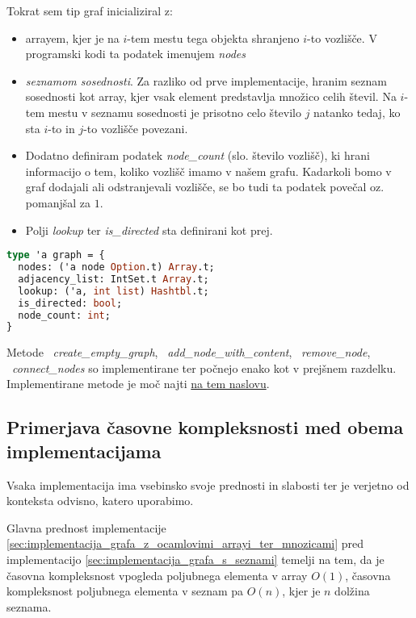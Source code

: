 \documentclass[mat1, tisk]{fmfdelo}
\begin{document}
Tokrat sem tip graf inicializiral z:
\begin{itemize}
  \item arrayem, kjer je na $i$-tem mestu tega objekta shranjeno $i$-to vozlišče. V programski kodi ta podatek imenujem \textit{nodes}
  \item \textit{seznamom sosednosti}. Za razliko od prve implementacije, hranim seznam sosednosti kot array, kjer vsak element predstavlja množico celih števil.
  Na $i$-tem mestu v seznamu sosednosti je prisotno celo število $j$ natanko tedaj, ko sta $i$-to in $j$-to vozlišče povezani.
  \item Dodatno definiram podatek \textit{node\_count} (slo. število vozlišč), ki hrani informacijo o tem, koliko vozlišč imamo v našem grafu. Kadarkoli
  bomo v graf dodajali ali odstranjevali vozlišče, se bo tudi ta podatek povečal oz. pomanjšal za $1$.
  \item Polji \textit{lookup} ter \textit{is\_directed} sta definirani kot prej.
\end{itemize}

\begin{lstlisting}[language=Caml, caption={Definicija posodobljenega tipa graf v OCamlu}, label={lst:graph_ocaml_type_array_implementation}]
type 'a graph = {
  nodes: ('a node Option.t) Array.t;
  adjacency_list: IntSet.t Array.t;
  lookup: ('a, int list) Hashtbl.t;
  is_directed: bool;
  node_count: int;
}
\end{lstlisting}

Metode ~\textit{create\_empty\_graph}, ~\textit{add\_node\_with\_content}, ~\textit{remove\_node}, ~\textit{connect\_nodes} so implementirane ter počnejo enako kot 
v prejšnem razdelku. Implementirane metode je moč najti 
\href{https://github.com/tjazerzen/parallelisation-of-graph-algorithms-in-functional-programming-languages/tree/predstavitev_grafa_z_arrayi_ter_mnozicami/playground/graph}{na tem naslovu}.

\subsection{Primerjava časovne kompleksnosti med obema implementacijama}

Vsaka implementacija ima vsebinsko svoje prednosti in slabosti ter je verjetno od konteksta odvisno, katero uporabimo.

Glavna prednost implementacije \ref*{sec:implementacija_grafa_z_ocamlovimi_arrayi_ter_mnozicami} pred implementacijo \ref*{sec:implementacija_grafa_s_seznami}
temelji na tem, da je časovna kompleksnost vpogleda poljubnega elementa v array $O(1)$, časovna kompleksnost poljubnega elementa v seznam pa $O(n)$, 
kjer je $n$ dolžina seznama.
\end{document}
